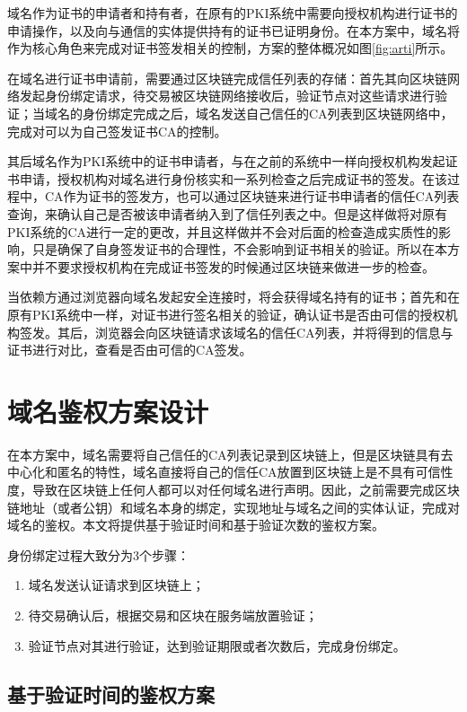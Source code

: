 域名作为证书的申请者和持有者，在原有的PKI系统中需要向授权机构进行证书的申请操作，以及向与通信的实体提供持有的证书已证明身份。在本方案中，域名将作为核心角色来完成对证书签发相关的控制，方案的整体概况如图\ref{fig:arti}所示。

在域名进行证书申请前，需要通过区块链完成信任列表的存储：首先其向区块链网络发起身份绑定请求，待交易被区块链网络接收后，验证节点对这些请求进行验证；当域名的身份绑定完成之后，域名发送自己信任的CA列表到区块链网络中，完成对可以为自己签发证书CA的控制。

其后域名作为PKI系统中的证书申请者，与在之前的系统中一样向授权机构发起证书申请，授权机构对域名进行身份核实和一系列检查之后完成证书的签发。在该过程中，CA作为证书的签发方，也可以通过区块链来进行证书申请者的信任CA列表查询，来确认自己是否被该申请者纳入到了信任列表之中。但是这样做将对原有PKI系统的CA进行一定的更改，并且这样做并不会对后面的检查造成实质性的影响，只是确保了自身签发证书的合理性，不会影响到证书相关的验证。所以在本方案中并不要求授权机构在完成证书签发的时候通过区块链来做进一步的检查。

当依赖方通过浏览器向域名发起安全连接时，将会获得域名持有的证书；首先和在原有PKI系统中一样，对证书进行签名相关的验证，确认证书是否由可信的授权机构签发。其后，浏览器会向区块链请求该域名的信任CA列表，并将得到的信息与证书进行对比，查看是否由可信的CA签发。


\section{域名鉴权方案设计}

在本方案中，域名需要将自己信任的CA列表记录到区块链上，但是区块链具有去中心化和匿名的特性，域名直接将自己的信任CA放置到区块链上是不具有可信性度，导致在区块链上任何人都可以对任何域名进行声明。因此，之前需要完成区块链地址（或者公钥）和域名本身的绑定，实现地址与域名之间的实体认证，完成对域名的鉴权。本文将提供基于验证时间和基于验证次数的鉴权方案。

身份绑定过程大致分为3个步骤：

\begin{enumerate}
	\item 域名发送认证请求到区块链上；
	\item 待交易确认后，根据交易和区块在服务端放置验证；
	\item 验证节点对其进行验证，达到验证期限或者次数后，完成身份绑定。
\end{enumerate}

\subsection{基于验证时间的鉴权方案}

